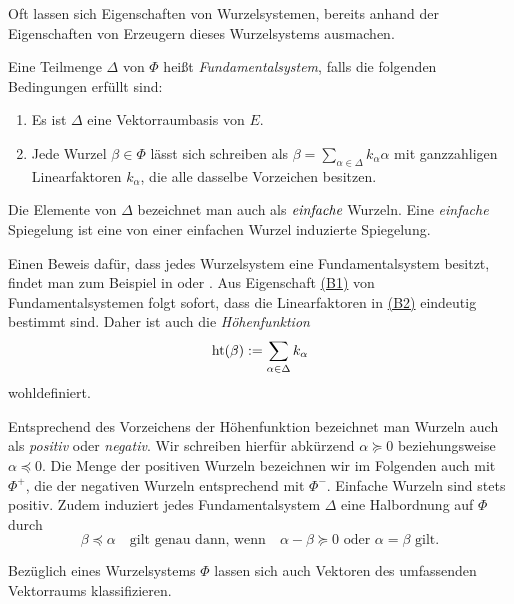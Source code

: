 Oft lassen sich Eigenschaften von Wurzelsystemen, bereits anhand der Eigenschaften von Erzeugern dieses Wurzelsystems ausmachen.

\begin{defn}
  Eine Teilmenge $\Delta$ von $\Phi$ heißt \emph{Fundamentalsystem}, falls die folgenden Bedingungen erfüllt sind:
  \begin{enumerate}[(B1)]
    \item\label{it:B1} Es ist $\Delta$ eine Vektorraumbasis von $E$.
    \item\label{it:B2} Jede Wurzel $\beta \in \Phi$ lässt sich schreiben als $\beta = \sum_{\alpha \in \Delta} k_\alpha \alpha$ mit ganzzahligen Linearfaktoren $k_\alpha$, die alle dasselbe Vorzeichen besitzen.
  \end{enumerate}
  Die Elemente von $\Delta$ bezeichnet man auch als $\emph{einfache}$ Wurzeln.
  Eine \emph{einfache} Spiegelung ist eine von einer einfachen Wurzel induzierte Spiegelung.
\end{defn}

\begin{bem}
  Einen Beweis dafür, dass jedes Wurzelsystem eine Fundamentalsystem besitzt, findet man zum Beispiel in \cite[S.48]{humphreys1972introduction} oder \cite[S.116]{erdmann2006introduction}.
  Aus Eigenschaft \hyperref[it:B1]{(B1)} von Fundamentalsystemen folgt sofort, dass die Linearfaktoren in \hyperref[it:B1]{(B2)} eindeutig bestimmt sind. 
  Daher ist auch die \emph{Höhenfunktion}
  \begin{displaymath}
    \operatorname{ht}(\beta) := \sum_{\alpha \in \Delta} k_\alpha 
  \end{displaymath}
  wohldefiniert.

  Entsprechend des Vorzeichens der Höhenfunktion bezeichnet man Wurzeln auch als \emph{positiv} oder \emph{negativ}.
  Wir schreiben hierfür abkürzend $\alpha \succeq 0$ beziehungsweise $\alpha \preceq 0$.
  Die Menge der positiven Wurzeln bezeichnen wir im Folgenden auch mit $\Phi^+$, die der negativen Wurzeln entsprechend mit $\Phi^-$.
  Einfache Wurzeln sind stets positiv.
 Zudem induziert jedes Fundamentalsystem $\Delta$ eine Halbordnung auf $\Phi$ durch
 \begin{displaymath}
   \beta \preceq \alpha \quad \text{gilt genau dann, wenn} \quad \alpha - \beta \succeq 0 \text{ oder } \alpha = \beta \text{ gilt}.
 \end{displaymath}
\end{bem}

Bezüglich eines Wurzelsystems $\Phi$ lassen sich auch Vektoren des umfassenden Vektorraums klassifizieren.

